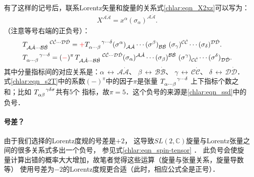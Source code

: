 有了这样的记号后，联系Lorentz矢量和旋量的关系式\eqref{chlar:eqn_X2xz}可以写为：
\begin{align}
    X^{{\mathcal{A}}\dot{\mathcal{A}}}=
    x^{\alpha} (\sigma_\alpha)^{{\mathcal{A}}\dot{\mathcal{A}}}.
\end{align}
（注意等号右端的正负号）：
\begin{subequations}\label{chlar:eqn_spin-tensor} 
    \begin{align}
        &T_{{\mathcal{A}}\dot{\mathcal{A}} \cdots {\mathcal{B}}\dot{\mathcal{B}}}^{\hphantom{B\dot{B} 
                \cdots B\dot{B}} {\mathcal{C}}\dot{\mathcal{C}}\cdots {\mathcal{D}}\dot{\mathcal{D}}}={\color{red}+}
        T_{\alpha \cdots \beta}^{\hphantom{\alpha \cdots \beta} \gamma\cdots \delta}
        (\sigma^\alpha)_{{\mathcal{A}}\dot{\mathcal{A}}} \cdots (\sigma^\beta)_{{\mathcal{B}}\dot{\mathcal{B}}} \ 
        (\sigma_\gamma)^{{\mathcal{C}}\dot{\mathcal{C}}} \cdots (\sigma_\delta)^{{\mathcal{D}}\dot{\mathcal{D}}} .
        \label{chlar:eqn_T2s} \\
        &T_{\alpha \cdots \beta}^{\hphantom{\alpha \cdots \beta} \gamma\cdots \delta} = ({\color{red}-})^{\pi}\, 
        T_{{\mathcal{A}}\dot{\mathcal{A}} \cdots {\mathcal{B}}\dot{\mathcal{B}}}^{\hphantom{B\dot{B} 
                \cdots B\dot{B}} {\mathcal{C}}\dot{\mathcal{C}}\cdots {\mathcal{D}}\dot{\mathcal{D}}}
        (\sigma_\alpha)^{{\mathcal{A}}\dot{\mathcal{A}}}\cdots(\sigma_\beta)^{{\mathcal{B}}\dot{\mathcal{B}}}\ 
        (\sigma^\gamma)_{{\mathcal{C}}\dot{\mathcal{C}}}\cdots(\sigma^\delta)_{{\mathcal{D}}\dot{\mathcal{D}}}.
        \label{chlar:eqn_s2T} 
    \end{align}
\end{subequations}  %
其中分量指标间的对应关系是：$\alpha \,\leftrightarrow\, {\mathcal{A}}\dot{\mathcal{A}}$、
$\beta \,\leftrightarrow\, {\mathcal{B}}\dot{\mathcal{B}}$、
$\gamma \,\leftrightarrow\, {\mathcal{C}}\dot{\mathcal{C}}$、
$\delta \,\leftrightarrow\, {\mathcal{D}}\dot{\mathcal{D}}$．
式\eqref{chlar:eqn_s2T}中的系数$(-)^\pi$中的因子$\pi$是张量
$T_{\alpha \cdots \beta}^{\hphantom{\alpha \cdots \beta} \gamma\cdots \delta}$
上下指标个数之和；比如
$T_{\alpha \beta}^{\hphantom{\alpha \beta} \gamma \delta \sigma}$共有5个
指标，故$\pi=5$．这个负号的来源是\eqref{chlar:eqn_ssd}中的负号．




\paragraph{号差？}
由于我们选择的Lorentz度规的号差是$+2$，
这导致$SL(2,\mathbb{C})$旋量与Lorentz张量之间的很多关系式多出一个{\kaishu 负号}，
参见式\eqref{chlar:eqn_spin-tensor} ．
此负号会使旋量计算出错的概率大大增加，故笔者觉得这些运算（旋量与张量关系，旋量导数等）
使用号差为$-2$的Lorentz度规更合适（此时，相应公式全是正号\cite{penrose-Rindler1984}）．






